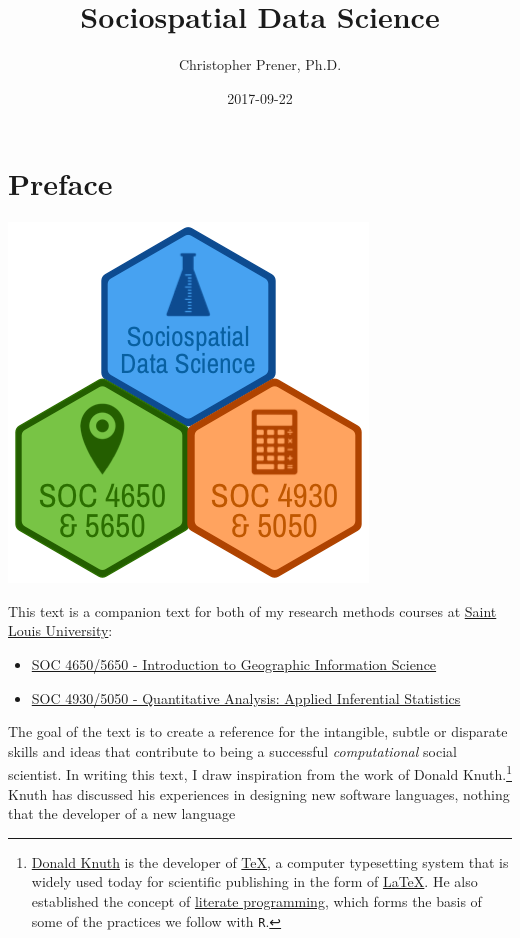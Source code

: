 \documentclass[]{book}
\title{Sociospatial Data Science}
\author{Christopher Prener, Ph.D.}
\date{2017-09-22}
\providecommand{\tightlist}{%
  \setlength{\itemsep}{0pt}\setlength{\parskip}{0pt}}
\let\rmarkdownfootnote\footnote%
\def\footnote{\protect\rmarkdownfootnote}
\theoremstyle{definition}
\theoremstyle{definition}
\theoremstyle{definition}
\theoremstyle{remark}
\begin{document}
\maketitle

{
\setcounter{tocdepth}{1}
\tableofcontents
}
\chapter*{Preface}\label{preface}

\begin{center}\includegraphics[width=0.4\linewidth]{images/SSDSBookBanner} \end{center}

This text is a companion text for both of my research methods courses at
\href{https://slu.edu}{Saint Louis University}:

\begin{itemize}
\tightlist
\item
  \href{https://slu-soc5650.github.io}{SOC 4650/5650 - Introduction to
  Geographic Information Science}
\item
  \href{https://slu-soc5050.github.io}{SOC 4930/5050 - Quantitative
  Analysis: Applied Inferential Statistics}
\end{itemize}

The goal of the text is to create a reference for the intangible, subtle
or disparate skills and ideas that contribute to being a successful
\emph{computational} social scientist. In writing this text, I draw
inspiration from the work of Donald Knuth.\footnote{\href{https://en.wikipedia.org/wiki/Donald_Knuth}{Donald
  Knuth} is the developer of
  \href{https://en.wikipedia.org/wiki/TeX}{TeX}, a computer typesetting
  system that is widely used today for scientific publishing in the form
  of \href{https://en.wikipedia.org/wiki/LaTeX}{LaTeX}. He also
  established the concept of
  \href{https://en.wikipedia.org/wiki/Literate_programming}{literate
  programming}, which forms the basis of some of the practices we follow
  with \texttt{R}.} Knuth has discussed his experiences in designing new
software languages, nothing that the developer of a new language
\end{document}
